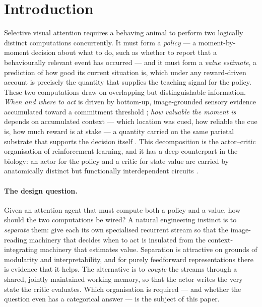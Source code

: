 \section{Introduction}
\label{sec:intro}

Selective visual attention requires a behaving animal to perform two logically distinct computations concurrently. It must form a \emph{policy} --- a moment-by-moment decision about what to do, such as whether to report that a behaviourally relevant event has occurred --- and it must form a \emph{value estimate}, a prediction of how good its current situation is, which under any reward-driven account is precisely the quantity that supplies the teaching signal for the policy. These two computations draw on overlapping but distinguishable information. \emph{When and where to act} is driven by bottom-up, image-grounded sensory evidence accumulated toward a commitment threshold \citep{gold2007neural}; \emph{how valuable the moment is} depends on accumulated context --- which location was cued, how reliable the cue is, how much reward is at stake --- a quantity carried on the same parietal substrate that supports the decision itself \citep{platt1999neural, sugrue2004matching}. This decomposition is the actor--critic organisation of reinforcement learning, and it has a deep counterpart in the biology: an actor for the policy and a critic for state value are carried by anatomically distinct but functionally interdependent circuits \citep{odoherty2004dissociable, maia2009reinforcement}.

\paragraph{The design question.}
Given an attention agent that must compute both a policy and a value, how should the two computations be wired? A natural engineering instinct is to \emph{separate} them: give each its own specialised recurrent stream so that the image-reading machinery that decides when to act is insulated from the context-integrating machinery that estimates value. Separation is attractive on grounds of modularity and interpretability, and for purely feedforward representations there is evidence that it helps. The alternative is to \emph{couple} the streams through a shared, jointly maintained working memory, so that the actor writes the very state the critic evaluates. Which organisation is required --- and whether the question even has a categorical answer --- is the subject of this paper.

